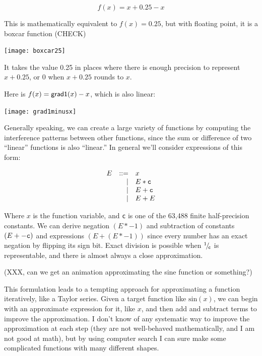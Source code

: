 \documentclass[twocolumn]{article}
\newcommand\sfrac[2]{\!{}\,^{#1}\!/{}\!_{#2}}
\begin{document}

$$f(x) = x + 0.25 - x$$

This is mathematically equivalent to $f(x) = 0.25$, but with floating point, it
is a boxcar function (CHECK)

\begin{center}
\texttt{[image: boxcar25]}
\end{center}

It takes the value 0.25 in places where there is enough precision to
represent $x + 0.25$, or 0 when $x + 0.25$ rounds to $x$.

Here is $f(x) = {\sf grad1}(x) - x$, which is also linear:
\begin{center}
\texttt{[image: grad1minusx]}
\end{center}

Generally speaking, we can create a large variety of functions by
computing the interference patterns between other functions, since the
sum or difference of two ``linear'' functions is also ``linear.'' In
general we'll consider expressions of this form:

\[
\begin{array}{rrl}
E & ::= & x              \\
  &  |  & E * {\tt c}    \\
  &  |  & E + {\tt c}    \\
  &  |  & E + E          \\
\end{array}
\]

Where $x$ is the function variable, and {\tt c} is one of the 63,488
finite half-precision constants. We can derive negation $(E * -1)$ and
subtraction of constants $(E + -{\tt c})$ and expressions $(E + (E *
-1))$ since every number has an exact negation by flipping its sign
bit. Exact division is possible when $\sfrac{1}{{\tt c}}$ is
representable, and there is almost always a close approximation.

(XXX, can we get an animation approximating the sine function or something?)

This formulation leads to a tempting approach for approximating a
function iteratively, like a Taylor series. Given a target function
like $\mathrm{sin}(x)$, we can begin with an approximate expression for it,
like $x$, and then add and subtract terms to improve the
approximation. I don't know of any systematic way to improve the
approximation at each step (they are not well-behaved mathematically,
and I am not good at math), but by using computer search I can sure
make some complicated functions with many different shapes.
\end{document}
